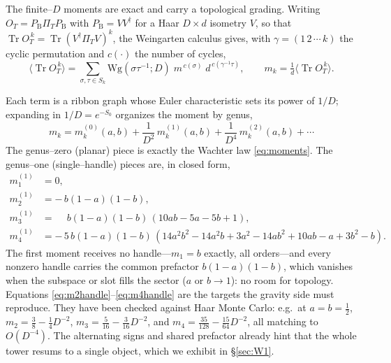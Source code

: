 \documentclass[11pt]{article}
\newcommand{\Tr}{\operatorname{Tr}}
\newcommand{\PB}{P_{\mathrm B}}
\newcommand{\PiT}{\Pi_T}
\newcommand{\OT}{O_T}
\newcommand{\dg}{^{\dagger}}
\newif\ifpedagogical
\newcommand{\ped}[1]{\ifpedagogical\par\smallskip{\small\color{pedcol}%
  \leftskip=1.4em\rightskip=1.4em\noindent$\triangleright$~\textit{Plain-language aside.}~#1\par}%
  \par\smallskip\fi}
\begin{document}
The finite--$D$ moments are exact and carry a topological grading. Writing
$\OT=\PB\PiT\PB$ with $\PB=VV\dg$ for a Haar $D\times d$ isometry $V$, so that
$\Tr\OT^{\,k}=\Tr(V\dg\PiT V)^{k}$, the Weingarten calculus
gives, with $\gamma=(1\,2\,\cdots\,k)$ the cyclic permutation and $c(\cdot)$ the number of cycles,
\begin{equation}
  \big\langle\Tr \OT^{\,k}\big\rangle
  =\sum_{\sigma,\tau\in S_k}\mathrm{Wg}(\sigma\tau^{-1};D)\;
  m^{\,c(\sigma)}\;d^{\,c(\gamma^{-1}\tau)} ,
  \qquad m_k=\tfrac1d\big\langle\Tr\OT^{\,k}\big\rangle .
  \label{eq:weingarten}
\end{equation}
\ped{``Weingarten calculus'' is just the formula for the average of a product of matrix entries of a
random unitary $U$: the answer is a sum over pairings of the $U$'s with the $\bar U$'s, indexed by
two permutations $\sigma,\tau$, weighted by the Weingarten function $\mathrm{Wg}$. It is the exact,
finite--$D$ version of Wick's theorem for the unitary group. Each pairing is a ``ribbon graph''
(a thickened Feynman diagram); how twisted it is---its genus---fixes its power of $1/D$.}
Each term is a ribbon graph whose Euler characteristic sets its power of $1/D$; expanding in
$1/D=e^{-S_0}$ organizes the moment by genus,
\begin{equation}
  m_k = m_k^{(0)}(a,b) + \frac{1}{D^2}\,m_k^{(1)}(a,b) + \frac{1}{D^4}\,m_k^{(2)}(a,b)+\cdots
  \label{eq:genus}
\end{equation}
The genus--zero (planar) piece is exactly the Wachter law \eqref{eq:moments}. The genus--one
(single--handle) pieces are, in closed form,
\begin{align}
  m_1^{(1)}&=0, \\
  m_2^{(1)}&=-\,b(1-a)(1-b), \label{eq:m2handle}\\
  m_3^{(1)}&=\phantom{-}b(1-a)(1-b)\,(10ab-5a-5b+1), \label{eq:m3handle}\\
  m_4^{(1)}&=-\,5\,b(1-a)(1-b)\,(14a^2b^2-14a^2b+3a^2-14ab^2+10ab-a+3b^2-b). \label{eq:m4handle}
\end{align}
The first moment receives no handle---$m_1=b$ exactly, all orders---and every nonzero handle carries
the common prefactor $b(1-a)(1-b)$, which vanishes when the subspace or slot fills the sector
($a$ or $b\to1$): no room for topology. Equations \eqref{eq:m2handle}--\eqref{eq:m4handle} are the
targets the gravity side must reproduce. They have been checked against Haar Monte Carlo: e.g.\ at
$a=b=\tfrac12$, $m_2=\tfrac38-\tfrac14 D^{-2}$, $m_3=\tfrac5{16}-\tfrac3{16}D^{-2}$, and
$m_4=\tfrac{35}{128}-\tfrac{15}{64}D^{-2}$, all matching to $O(D^{-4})$. The alternating signs and
shared prefactor already hint that the whole tower resums to a single object, which we exhibit in
\S\ref{sec:W1}.
\end{document}
